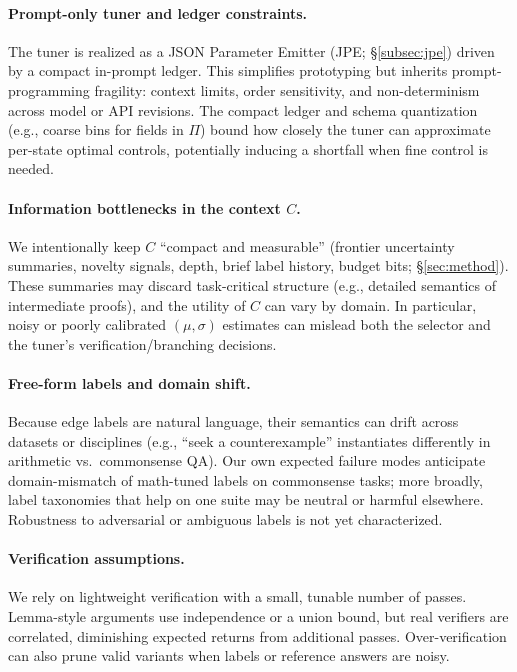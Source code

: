 \documentclass{article}
\theoremstyle{plain}
\theoremstyle{definition}
\theoremstyle{remark}
\begin{document}
\paragraph{Prompt-only tuner and ledger constraints.}
The tuner is realized as a JSON Parameter Emitter (JPE; \S\ref{subsec:jpe}) driven by a compact in-prompt ledger. This simplifies prototyping but inherits prompt-programming fragility: context limits, order sensitivity, and non-determinism across model or API revisions. The compact ledger and schema quantization (e.g., coarse bins for fields in $\Pi$) bound how closely the tuner can approximate per-state optimal controls, potentially inducing a shortfall when fine control is needed.

\paragraph{Information bottlenecks in the context $C$.}
We intentionally keep $C$ ``compact and measurable'' (frontier uncertainty summaries, novelty signals, depth, brief label history, budget bits; \S\ref{sec:method}). These summaries may discard task-critical structure (e.g., detailed semantics of intermediate proofs), and the utility of $C$ can vary by domain. In particular, noisy or poorly calibrated $(\mu,\sigma)$ estimates can mislead both the selector and the tuner's verification/branching decisions.

\paragraph{Free-form labels and domain shift.}
Because edge labels are natural language, their semantics can drift across datasets or disciplines (e.g., ``seek a counterexample'' instantiates differently in arithmetic vs.\ commonsense QA). Our own expected failure modes anticipate domain-mismatch of math-tuned labels on commonsense tasks; more broadly, label taxonomies that help on one suite may be neutral or harmful elsewhere. Robustness to adversarial or ambiguous labels is not yet characterized.

\paragraph{Verification assumptions.}
We rely on lightweight verification with a small, tunable number of passes. Lemma-style arguments use independence or a union bound, but real verifiers are correlated, diminishing expected returns from additional passes. Over-verification can also prune valid variants when labels or reference answers are noisy.
\end{document}
